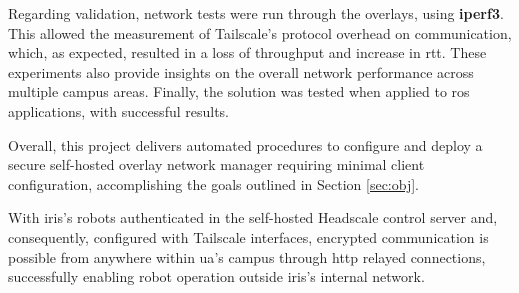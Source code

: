 \documentclass[11pt,twoside,a4paper]{report}
\begin{document}
Regarding validation, network tests were run through the overlays, using \textbf{iperf3}. This allowed the measurement of Tailscale's protocol overhead on communication, which, as expected, resulted in a loss of throughput and increase in \ac{rtt}. These experiments also provide insights on the overall network performance across multiple campus areas. Finally, the solution was tested when applied to \ac{ros} applications, with successful results.

Overall, this project delivers automated procedures to configure and deploy a secure self-hosted overlay network manager requiring minimal client configuration, accomplishing the goals outlined in Section \ref{sec:obj}.

With \ac{iris}'s robots authenticated in the self-hosted Headscale control server and, consequently, configured with Tailscale interfaces, encrypted communication is possible from anywhere within \ac{ua}'s campus through \ac{http} relayed connections, successfully enabling robot operation outside \ac{iris}'s internal network.

%
%
\cleardoublepage



\cleardoublepage
\end{document}

